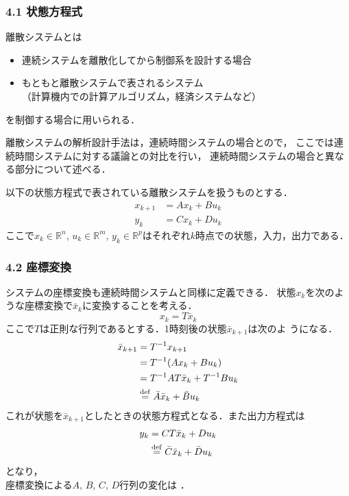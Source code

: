 

\begin{frame}[t]
\frametitle{4.1 状態方程式}
離散システムとは
\begin{itemize}
	\item 連続システムを離散化してから制御系を設計する場合
	\item もともと離散システムで表されるシステム\\
	（計算機内での計算アルゴリズム，経済システムなど）
\end{itemize}
を制御する場合に用いられる．

離散システムの解析設計手法は，連続時間システムの場合とので，
ここでは連続時間システムに対する議論との対比を行い，
連続時間システムの場合と異なる部分について述べる．

\vspace{5mm}

以下の状態方程式で表されている離散システムを扱うものとする．
\begin{align}
 x_{k+1} &= A x_k + B u_k \label{d_state_eq} \\
 y_k     &= C x_k + D u_k \label{d_output_eq}
\end{align}
ここで$x_k \in \mathbb{R}^n$, $u_k \in \mathbb{R}^m $, $y_k \in
\mathbb{R}^p $はそれぞれ$k$時点での状態，入力，出力である．
\end{frame}

\begin{frame}[t]
\frametitle{4.2 座標変換}
システムの座標変換も連続時間システムと同様に定義できる．
状態$x_k$を次のような座標変換で$\bar{x}_k$に変換することを考える．
\begin{equation}
 x_k = T \bar{x}_k
\end{equation}
ここで$T$は正則な行列であるとする．1時刻後の状態$\bar{x}_{k+1}$は次のよ
うになる．
\begin{align}
 \bar{x}_{k+1} &= T^{-1} x_{k+1} \nonumber \\
               &= T^{-1} ( A x_k + B u_k) \nonumber \\
               &= T^{-1} A T \bar{x}_k + T^{-1} B u_k \nonumber \\
               &\stackrel{\rm def}{=} \bar{A} \bar{x}_k + \bar{B} u_k
\end{align}
これが状態を$\bar{x}_{k+1}$としたときの状態方程式となる．また出力方程式は
\begin{align}
 y_k &= C T \bar{x}_k + D u_k \nonumber \\
     &\stackrel{\rm def}{=} \bar{C} \bar{x}_k + \bar{D} u_k
\end{align}
となり，\\
座標変換による$A$, $B$, $C$, $D$行列の変化は
．
\end{frame}

